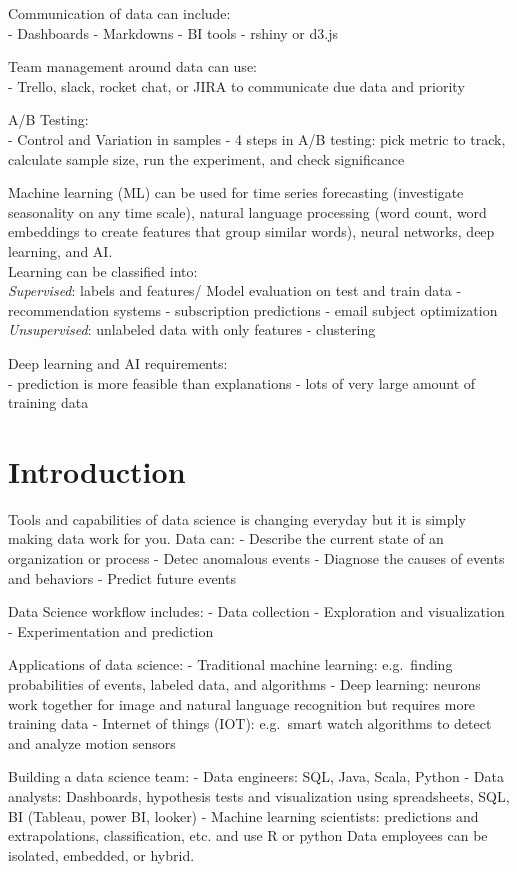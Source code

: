 \documentclass[]{book}
\begin{document}
Communication of data can include:\\
- Dashboards
- Markdowns
- BI tools
- rshiny or d3.js

Team management around data can use:\\
- Trello, slack, rocket chat, or JIRA to communicate due data and priority

A/B Testing:\\
- Control and Variation in samples
- 4 steps in A/B testing: pick metric to track, calculate sample size, run the experiment, and check significance

Machine learning (ML) can be used for time series forecasting (investigate seasonality on any time scale), natural language processing (word count, word embeddings to create features that group similar words), neural networks, deep learning, and AI.\\
Learning can be classified into:\\
\emph{Supervised}: labels and features/ Model evaluation on test and train data
- recommendation systems
- subscription predictions
- email subject optimization
\emph{Unsupervised}: unlabeled data with only features
- clustering

Deep learning and AI requirements:\\
- prediction is more feasible than explanations
- lots of very large amount of training data

\hypertarget{introduction}{%
\chapter{Introduction}\label{introduction}}

Tools and capabilities of data science is changing everyday but it is simply making data work for you. Data can:
- Describe the current state of an organization or process
- Detec anomalous events
- Diagnose the causes of events and behaviors
- Predict future events

Data Science workflow includes:
- Data collection
- Exploration and visualization
- Experimentation and prediction

Applications of data science:
- Traditional machine learning: e.g.~finding probabilities of events, labeled data, and algorithms
- Deep learning: neurons work together for image and natural language recognition but requires more training data
- Internet of things (IOT): e.g.~smart watch algorithms to detect and analyze motion sensors

Building a data science team:
- Data engineers: SQL, Java, Scala, Python
- Data analysts: Dashboards, hypothesis tests and visualization using spreadsheets, SQL, BI (Tableau, power BI, looker)
- Machine learning scientists: predictions and extrapolations, classification, etc. and use R or python
Data employees can be isolated, embedded, or hybrid.
\end{document}
